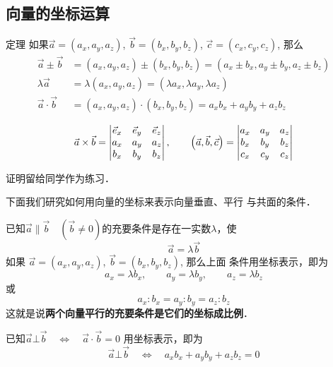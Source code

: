 \subsection{向量的坐标运算}

\begin{blk}{定理}
     如果$\vec{a}=(a_x,a_y,a_z)$, $\vec{b}=(b_x, b_y,b_z)$, 
$\vec{c}=(c_x,c_y,c_z)$, 那么
\[\begin{split}
    \vec{a}\pm \vec{b}&=(a_x,a_y,a_z)\pm (b_x,b_y,b_z)
=(a_x\pm b_x,a_y\pm b_y,a_z\pm b_z)\\
\lambda\vec{a}&=\lambda(a_x, a_y,a_z)=(\lambda a_x,\lambda 
a_y,\lambda a_z)\\
\vec{a}\cdot \vec{b}&=(a_x, a_y, a_z)\cdot (b_x,b_y,b_z)
=a_xb_x+a_yb_y+a_zb_z\\
\end{split}\]
\[\vec{a}\times \vec{b}=\begin{vmatrix}
  \vec{e}_x&\vec{e}_y&\vec{e}_z\\
  a_x&a_y&a_z\\
  b_x&b_y&b_z  
\end{vmatrix},\qquad \left(\vec{a},\vec{b},\vec{c}\right)=\begin{vmatrix}
    a_x&a_y&a_z\\
    b_x&b_y&b_z\\  
    c_x&c_y&c_z
\end{vmatrix}\]
\end{blk}


证明留给同学作为练习．

下面我们研究如何用向量的坐标来表示向量垂直、平行
与共面的条件．

已知$\vec{a}\parallel \vec{b}\quad (\vec{b}\ne 0)$的充要条件是存在一实数$\lambda$，使
$$\vec{a}=\lambda\vec{b}$$
如果
$\vec{a}=(a_x,a_y,a_z)$, $\vec{b}=(b_x,b_y,b_z)$, 那么上面
条件用坐标表示，即为
\begin{equation}
    a_x=\lambda b_x,\qquad  a_y=\lambda b_y,\qquad  a_z=\lambda b_z
\end{equation}
或
\begin{equation}
    a_x:b_x=a_y:b_y=a_z:b_z
\end{equation}
这就是说\textbf{两个向量平行的充要条件是它们的坐标成比例}．

已知$\vec{a}\bot \vec{b}\quad \Longleftrightarrow \quad \vec{a}\cdot \vec{b}=0$
用坐标表示，即为
\begin{equation}
    \vec{a}\bot \vec{b}\quad \Longleftrightarrow \quad a_xb_x+a_yb_y+a_zb_z=0
\end{equation}

